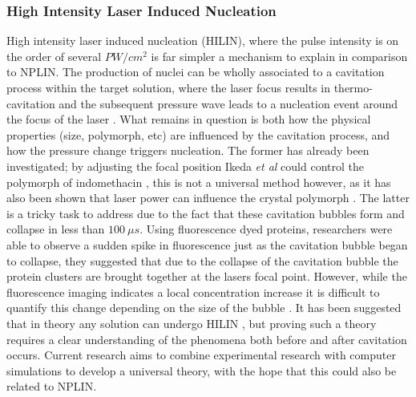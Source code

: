 \subsubsection{High Intensity Laser Induced Nucleation}
High intensity laser induced nucleation (HILIN), where the pulse intensity 
is on the order of several $PW/cm^2$ is far simpler a mechanism to explain 
in comparison to NPLIN. The production of nuclei can be wholly associated 
to a cavitation process within the target solution, where the laser focus 
results in thermo-cavitation and the subsequent pressure wave leads to
a nucleation event around the focus of the laser \cite{Yoshikawa2005, 
Soare2011, Barber2019}. What remains in question is both how the physical 
properties (size, polymorph, etc) are influenced by the cavitation process, 
and how the pressure change triggers nucleation. The former has already 
been investigated; by adjusting the focal position Ikeda \textit{et al} 
could control the polymorph of indomethacin \cite{Ikeda2015}, this is not 
a universal method however, as it has also been shown that laser power can 
influence the crystal polymorph \cite{Wang2010}. The latter is a tricky 
task to address due to the fact that these cavitation bubbles form and collapse in less than $100\ \mu s$. Using fluorescence dyed proteins, researchers were able to observe a sudden spike in fluorescence just 
as the cavitation bubble began to collapse, they suggested that due 
to the collapse of the cavitation bubble the protein clusters are brought together at the lasers focal point. However, while the fluorescence 
imaging indicates a local concentration increase it is difficult to 
quantify this change depending on the size of the bubble \cite{Korede2023}. It
has been suggested that in theory any solution can undergo HILIN \cite{Korede2023}, but proving such a theory requires a clear 
understanding of the phenomena both before and after cavitation occurs. Current research aims to combine experimental research with computer 
simulations to develop a universal theory, with the hope that this could 
also be related to NPLIN.   

